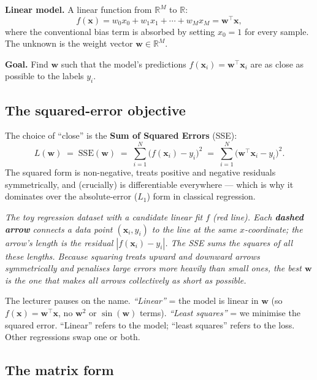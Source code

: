 \documentclass[11pt, a4paper]{article}
\begin{document}
\textbf{Linear model.} A linear function from $\mathbb{R}^M$ to $\mathbb{R}$:
\[
f(\mathbf{x}) = w_0 x_0 + w_1 x_1 + \cdots + w_M x_M = \mathbf{w}^\top \mathbf{x},
\]
where the conventional bias term is absorbed by setting $x_0 = 1$ for every sample. The unknown is the weight vector $\mathbf{w}\in\mathbb{R}^M$.

\textbf{Goal.} Find $\mathbf{w}$ such that the model's predictions $f(\mathbf{x}_i) = \mathbf{w}^\top\mathbf{x}_i$ are as close as possible to the labels $y_i$.

\subsection{The squared-error objective}

The choice of ``close'' is the \textbf{Sum of Squared Errors} (SSE):
\[
L(\mathbf{w}) \;=\; \mathrm{SSE}(\mathbf{w}) \;=\; \sum_{i=1}^N \big(f(\mathbf{x}_i) - y_i\big)^2 \;=\; \sum_{i=1}^N \big(\mathbf{w}^\top\mathbf{x}_i - y_i\big)^2.
\]
The squared form is non-negative, treats positive and negative residuals symmetrically, and (crucially) is differentiable everywhere — which is why it dominates over the absolute-error ($L_1$) form in classical regression.

\begin{center}

\footnotesize\textit{The toy regression dataset with a candidate linear fit $f$ (red line). Each \textbf{dashed arrow} connects a data point $(\mathbf{x}_i, y_i)$ to the line at the same $x$-coordinate; the arrow's length is the residual $|f(\mathbf{x}_i) - y_i|$. The SSE sums the \emph{squares} of all these lengths. Because squaring treats upward and downward arrows symmetrically and penalises large errors more heavily than small ones, the best $\mathbf{w}$ is the one that makes all arrows collectively as short as possible.}
\end{center}

\begin{notebox}
The lecturer pauses on the name. \emph{``Linear''} = the model is linear in $\mathbf{w}$ (so $f(\mathbf{x})=\mathbf{w}^\top\mathbf{x}$, no $\mathbf{w}^2$ or $\sin(\mathbf{w})$ terms). \emph{``Least squares''} = we minimise the squared error. ``Linear'' refers to the model; ``least squares'' refers to the loss. Other regressions swap one or both.
\end{notebox}

\subsection{The matrix form}
\end{document}
